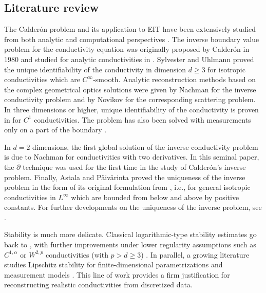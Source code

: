 \documentclass[pdflatex,sn-mathphys-num]{sn-jnl-preprint}
\theoremstyle{thmstyleone}%
\theoremstyle{thmstyletwo}%
\theoremstyle{thmstylethree}%
\numberwithin{equation}{section}
\numberwithin{theorem}{section}
\begin{document}
\subsection{Literature review}\label{sec:intro_lit}
The Calder\'on problem and its application to EIT have been extensively studied from both analytic and computational perspectives \cite{Borcea,mueller2012linear,uhlmann2009electrical,hanke2017taste}.
The inverse boundary value problem for the conductivity equation
was originally proposed by Calder\'on \cite{calderon2006inverse} in 1980 and studied for analytic
conductivities in \cite{KohnVogelius1,KohnVogelius2}.
Sylvester and Uhlmann \cite{SylvesterUhlmann} proved the unique identifiability of the
conductivity in dimension $d\geq 3$ for isotropic conductivities which
are $C^\infty$-smooth. Analytic reconstruction methods based
on the complex geometrical optics solutions were given by Nachman 
\cite{Nachman1988} for the inverse conductivity problem and by Novikov \cite{Novikov1998} for the corresponding scattering problem. In three dimensions or higher, unique identifiability of the
conductivity is proven in \cite{HabermanTataru2013} for $C^1$ conductivities.
The problem has also been solved with measurements only on a part of the boundary \cite{KenigSjostrandUhlmann}.

In $d=2$ dimensions, the first global solution of the inverse conductivity problem is due to Nachman \cite{nachman1996global} for conductivities with two derivatives. In this seminal paper, the $\overline\partial$ technique was used for the first time in the study of Calder\'on's inverse problem.
Finally, Astala and P\"aiv\"arinta \cite{astala2006calderon} proved the uniqueness of the inverse 
problem in the form of its original formulation from \cite{calderon2006inverse}, i.e., for general isotropic conductivities in $L^\infty$ which are bounded from below and above by positive constants. For further developments on the uniqueness of the inverse problem, see
\cite{astala2006calderon,AstalaLassasPaivarinta2016,FerreiraKSU,faraco2018characterization,caro2016global,IdeUhlmannCPAM,
novikov2010global,uhlmann2009electrical}. 

Stability is much more delicate. Classical logarithmic-type stability estimates go back to \cite{alessandrini1988stable,barcelo2001stability,clop2010stability}, with further improvements under lower regularity assumptions such as $C^{1,\alpha}$ \cite{caro2013stability} or $W^{2,p}$ conductivities (with $p>d\geq 3$) \cite{choulli2023comments}. In parallel, a growing literature studies Lipschitz stability for finite-dimensional parametrizations and measurement models \cite{alberti2022infinite,harrach2019uniqueness,garde2024linearized,garde2025infinite}. This line of work provides a firm justification for reconstructing realistic conductivities from discretized data.
\end{document}
